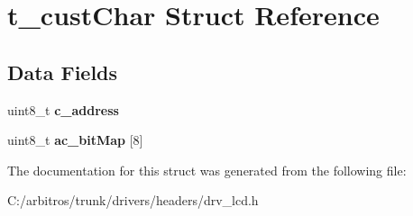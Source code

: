 \hypertarget{structt__cust_char}{\section{t\-\_\-cust\-Char Struct Reference}
\label{structt__cust_char}
}
\subsection*{Data Fields}
\begin{DoxyCompactItemize}
\item 
\hypertarget{structt__cust_char_a8c6c00ab3761d45720e9bcdf9f08e624}{uint8\-\_\-t {\bfseries c\-\_\-address}}\label{structt__cust_char_a8c6c00ab3761d45720e9bcdf9f08e624}

\item 
\hypertarget{structt__cust_char_a38157a301f42fce16b88e81decdf74c3}{uint8\-\_\-t {\bfseries ac\-\_\-bit\-Map} \mbox{[}8\mbox{]}}\label{structt__cust_char_a38157a301f42fce16b88e81decdf74c3}

\end{DoxyCompactItemize}


The documentation for this struct was generated from the following file\-:\begin{DoxyCompactItemize}
\item 
C\-:/arbitros/trunk/drivers/headers/drv\-\_\-lcd.\-h\end{DoxyCompactItemize}
